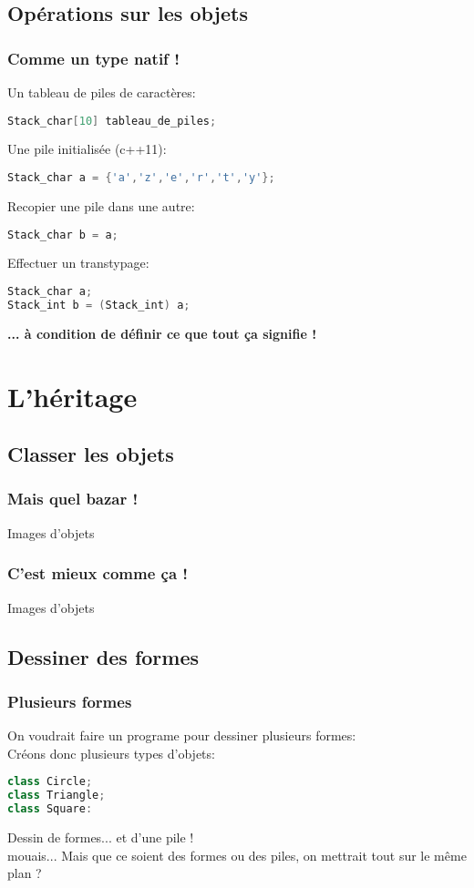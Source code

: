\documentclass{beamer}
\begin{document}
  \subsection {Opérations sur les objets}
  \begin{frame}[fragile=singleslide,shrink=20]
  \frametitle{Comme un type natif !}
   Un tableau de piles de caractères:
  \begin{lstlisting}[language=c++]
Stack_char[10] tableau_de_piles;
\end{lstlisting}
Une pile initialisée (c++11):
  \begin{lstlisting}[language=c++]
Stack_char a = {'a','z','e','r','t','y'};
\end{lstlisting}
Recopier une pile dans une autre:
\begin{lstlisting}[language=c++]
Stack_char b = a;
\end{lstlisting}
Effectuer un transtypage:
\begin{lstlisting}[language=c++]
Stack_char a;
Stack_int b = (Stack_int) a;
\end{lstlisting}
\textbf{... à condition de définir ce que tout ça signifie !}
\end{frame}

\section{L'héritage}
\subsection {Classer les objets}
  \begin{frame}[fragile=singleslide,shrink=20]
  \frametitle{Mais quel bazar !}
Images d'objets
\end{frame}

  \begin{frame}[fragile=singleslide,shrink=20]
  \frametitle{C'est mieux comme ça !}
Images d'objets
\end{frame}

\subsection{Dessiner des formes}
  \begin{frame}[fragile=singleslide,shrink=20]
  \frametitle{Plusieurs formes}
  On voudrait faire un programe pour dessiner plusieurs formes: \\
  Créons donc plusieurs types d'objets:
\begin{lstlisting}[language=c++]
class Circle;
class Triangle;
class Square:
\end{lstlisting}
Dessin de formes... et d'une pile ! \\
mouais... Mais que ce soient des formes ou des piles, on mettrait tout sur le même plan ?
\end{frame}
\end{document}
